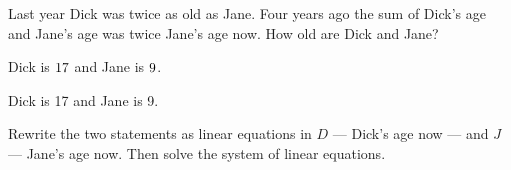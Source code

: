 \documentclass{ximera}
\begin{document}
\begin{exercise} \label{c2.1.10}
Last year Dick was twice as old as Jane.  Four years ago the
sum of Dick's age and Jane's age was twice Jane's age now.  How
old are Dick and Jane?
\begin{prompt}
  Dick is ${17}$ and Jane is ${9}$.
\end{prompt}


\ans Dick is 17 and Jane is 9.

\soln  Rewrite the two statements
  as linear equations in $D$ --- Dick's age now --- and $J$ ---
  Jane's age now.  Then solve the system of linear equations.

\begin{solution}

\end{solution}
\end{exercise}
\end{document}
